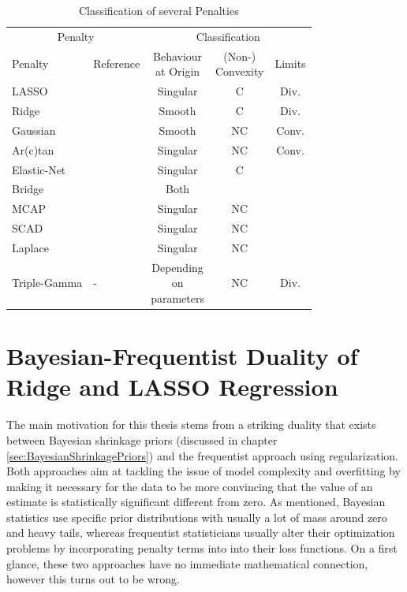 \documentclass[12pt,a4paper]{article}
\begin{document}
\begin{table}[!h]
\begin{center}
\begin{tabular}{llccc}\toprule
 \multicolumn{2}{c}{Penalty} & \multicolumn{3}{c}{Classification}\\
		\cmidrule(r{4pt}){1-2} \cmidrule(l){3-5}
Penalty     	& Reference  & \makecell{Behaviour\\ at Origin} & \makecell{(Non-)\\Convexity} & Limits\\\midrule

LASSO 	& \textcite{Tibishirani1996}	& Singular	&	C 	& Div.\\
Ridge 	& \textcite{HoerlKennard1970a}	& Smooth		& C			& Div.\\
Gaussian & \textcite{JohnVettamWu2022}	& Smooth		& NC 	& Conv.\\
Ar(c)tan 	& \textcite{WangZhu2016}	& Singular 	& NC 	& Conv. \\
Elastic-Net & \textcite{ZouHastie2005} & Singular & C &\\
Bridge & \textcite{FrankFriedman1993}& Both &&\\
MCAP & \textcite{Zhang2010}& Singular & NC &\\
SCAD & \textcite{FanLi2001} & Singular & NC &\\
Laplace & \textcite{TrzaskoManduca2009} & Singular & NC &\\
Triple-Gamma & - & \makecell{Depending\\ on \\ parameters} & NC & Div. \\

\end{tabular}
\caption{Classification of several Penalties}
\label{tab:ClassificationOfPenalties}
\end{center}
\end{table}
 
\section{Bayesian-Frequentist Duality of Ridge and LASSO Regression}

The main motivation for this thesis stems from a striking duality that exists between Bayesian shrinkage priors (discussed in chapter \ref{sec:BayesianShrinkagePriors}) and the frequentist approach using regularization. Both approaches aim at tackling the issue of model complexity and overfitting by making it necessary for the data to be more convincing that the value of an estimate is statistically significant different from zero. As mentioned, Bayesian statistics use specific prior distributions with usually a lot of mass around zero and heavy tails, whereas frequentist statisticians usually alter their optimization problems by incorporating penalty terms into into their loss functions. On a first glance, these two approaches have no immediate mathematical connection, however this turns out to be wrong.\\
\end{document}
